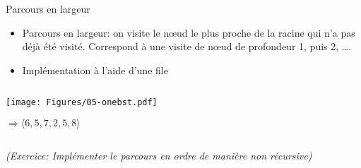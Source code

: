 \begin{frame}{Parcours en largeur}



\begin{itemize}
\item Parcours en largeur: on visite le n\oe ud le plus proche de la racine qui n'a pas déjà été visité. Correspond à une visite de n\oe ud de profondeur 1, puis 2, \ldots.
\item Implémentation à l'aide d'une file
\end{itemize}


\begin{columns}
\begin{column}{5cm}
\begin{center}
\texttt{[image: Figures/05-onebst.pdf]}
\bigskip

$\Rightarrow \langle 6,5,7,2,5,8\rangle$
\end{center}
\end{column}~~~~~~~
\begin{column}{5cm}
\begin{center}
\begin{footnotesize}
\end{footnotesize}
\end{center}
\end{column}
\end{columns}

\medskip

\emph{(Exercice: Implémenter le parcours en ordre de manière non récursive)}
\end{frame}

